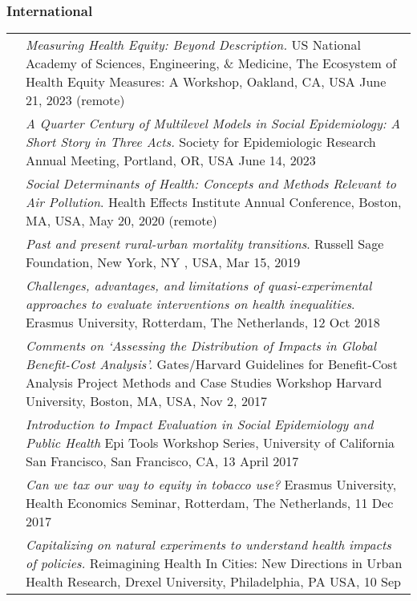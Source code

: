 \documentclass[
  letterpaper,
  DIV=11,
  numbers=noendperiod]{scrartcl}
\begin{document}
\hypertarget{international-1}{%
\subsubsection{International}\label{international-1}}

\begin{longtable}[]{@{}
  >{\raggedright\arraybackslash}p{}
  >{\raggedright\arraybackslash}p{}@{}}
\toprule\noalign{}
\endhead
\bottomrule\noalign{}
\endlastfoot
2023 & \emph{Measuring Health Equity: Beyond Description.} US National
Academy of Sciences, Engineering, \& Medicine, The Ecosystem of Health
Equity Measures: A Workshop, Oakland, CA, USA June 21, 2023 (remote) \\
2023 & \emph{A Quarter Century of Multilevel Models in Social
Epidemiology: A Short Story in Three Acts.} Society for Epidemiologic
Research Annual Meeting, Portland, OR, USA June 14, 2023 \\
2020 & \emph{Social Determinants of Health: Concepts and Methods
Relevant to Air Pollution}. Health Effects Institute Annual Conference,
Boston, MA, USA, May 20, 2020 (remote) \\
2019 & \emph{Past and present rural-urban mortality transitions}.
Russell Sage Foundation, New York, NY , USA, Mar 15, 2019 \\
2018 & \emph{Challenges, advantages, and limitations of
quasi-experimental approaches to evaluate interventions on health
inequalities}. Erasmus University, Rotterdam, The Netherlands, 12 Oct
2018 \\
2017 & \emph{Comments on `Assessing the Distribution of Impacts in
Global Benefit-Cost Analysis'.} Gates/Harvard Guidelines for
Benefit-Cost Analysis Project Methods and Case Studies Workshop Harvard
University, Boston, MA, USA, Nov 2, 2017 \\
2017 & \emph{Introduction to Impact Evaluation in Social Epidemiology
and Public Health} Epi Tools Workshop Series, University of California
San Francisco, San Francisco, CA, 13 April 2017 \\
2017 & \emph{Can we tax our way to equity in tobacco use?} Erasmus
University, Health Economics Seminar, Rotterdam, The Netherlands, 11 Dec
2017 \\
2015 & \emph{Capitalizing on natural experiments to understand health
impacts of policies.} Reimagining Health In Cities: New Directions in
Urban Health Research, Drexel University, Philadelphia, PA USA, 10 Sep

\end{longtable}
\end{document}
